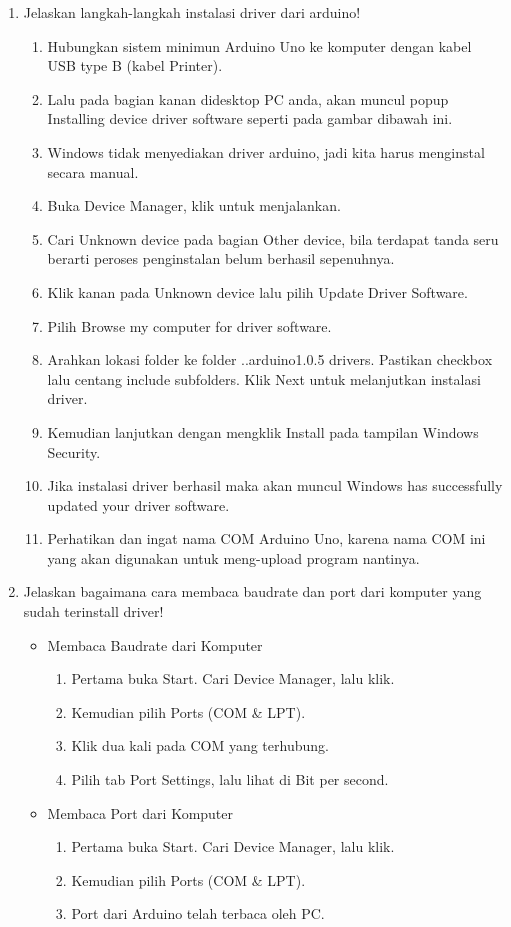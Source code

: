 \begin{enumerate}
			\item Jelaskan langkah-langkah instalasi driver dari arduino!
				\begin{enumerate}
					\item Hubungkan sistem minimun Arduino Uno ke komputer dengan kabel USB type B (kabel Printer).
					\item Lalu pada bagian kanan didesktop PC anda, akan muncul popup Installing device driver software seperti pada gambar dibawah ini.
					\item Windows tidak menyediakan driver arduino, jadi kita harus menginstal secara manual.
					\item Buka Device Manager, klik untuk menjalankan.
					\item Cari Unknown device pada bagian Other device, bila terdapat tanda seru berarti peroses penginstalan belum berhasil sepenuhnya.
					\item Klik kanan pada Unknown device lalu pilih Update Driver Software.
					\item Pilih Browse my computer for driver software.
					\item Arahkan lokasi folder ke folder ..arduino1.0.5 drivers. Pastikan checkbox lalu centang include subfolders. Klik Next untuk melanjutkan instalasi driver.
					\item Kemudian lanjutkan dengan mengklik Install pada tampilan Windows Security.
					\item Jika instalasi driver berhasil maka akan muncul Windows has successfully updated your driver software.
					\item Perhatikan dan ingat nama COM Arduino Uno, karena nama COM ini yang akan digunakan untuk meng-upload program nantinya.
				\end{enumerate}
				
			\item Jelaskan bagaimana cara membaca baudrate dan port dari komputer yang sudah terinstall driver!
				\begin{itemize}
					\item Membaca Baudrate dari Komputer
						\begin{enumerate}
							\item Pertama buka Start. Cari Device Manager, lalu klik.
							\item Kemudian pilih Ports (COM \& LPT).
							\item Klik dua kali pada COM yang terhubung.
							\item Pilih tab Port Settings, lalu lihat di Bit per second.
						\end{enumerate}
					\item Membaca Port dari Komputer
						\begin{enumerate}
							\item Pertama buka Start. Cari Device Manager, lalu klik.
							\item Kemudian pilih Ports (COM \& LPT).
							\item Port dari Arduino telah terbaca oleh PC.
						\end{enumerate}
				\end{itemize}
							

\end{enumerate}

